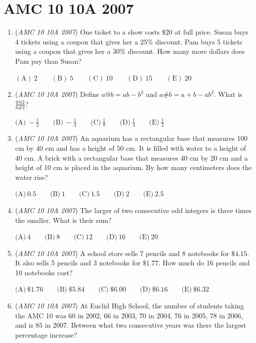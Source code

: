 \section{AMC 10 10A 2007}
        \begin{enumerate}
        	\item (\textit{AMC 10 10A 2007}) One ticket to a show costs $\$20$ at full price. Susan buys 4 tickets using a coupon that gives her a $25\%$ discount. Pam buys 5 tickets using a coupon that gives her a $30\%$ discount. How many more dollars does Pam pay than Susan?


 $\mathrm{(A)}\ 2\qquad \mathrm{(B)}\ 5\qquad \mathrm{(C)}\ 10\qquad \mathrm{(D)}\ 15\qquad \mathrm{(E)}\ 20$


	\item (\textit{AMC 10 10A 2007}) Define $a@b = ab - b^{2}$ and $a\#b = a + b - ab^{2}$. What is $\frac {6@2}{6\#2}$?


 $\text{(A)}\ - \frac {1}{2}\qquad \text{(B)}\ - \frac {1}{4}\qquad \text{(C)}\ \frac {1}{8}\qquad \text{(D)}\ \frac {1}{4}\qquad \text{(E)}\ \frac {1}{2}$


	\item (\textit{AMC 10 10A 2007}) An aquarium has a rectangular base that measures 100 cm by 40 cm and has a height of 50 cm. It is filled with water to a height of 40 cm. A brick with a rectangular base that measures 40 cm by 20 cm and a height of 10 cm is placed in the aquarium. By how many centimeters does the water rise? 


 $\text{(A)}\ 0.5 \qquad \text{(B)}\ 1 \qquad \text{(C)}\ 1.5 \qquad \text{(D)}\ 2 \qquad \text{(E)}\ 2.5$


	\item (\textit{AMC 10 10A 2007}) The larger of two consecutive odd integers is three times the smaller. What is their sum?


 $\text{(A)}\ 4 \qquad \text{(B)}\ 8 \qquad \text{(C)}\ 12 \qquad \text{(D)}\ 16 \qquad \text{(E)}\ 20$


	\item (\textit{AMC 10 10A 2007}) A school store sells 7 pencils and 8 notebooks for $\$4.15$. It also sells 5 pencils and 3 notebooks for $\$1.77$. How much do 16 pencils and 10 notebooks cost?


 $\text{(A)}\ \$1.76 \qquad \text{(B)}\ \$5.84 \qquad \text{(C)}\ \$6.00 \qquad \text{(D)}\ \$6.16 \qquad \text{(E)}\ \$6.32$


	\item (\textit{AMC 10 10A 2007}) At Euclid High School, the number of students taking the AMC 10 was $60$ in 2002, $66$ in 2003, $70$ in 2004, $76$ in 2005, $78$ in 2006, and is $85$ in 2007. Between what two consecutive years was there the largest percentage increase?



\end{enumerate}
